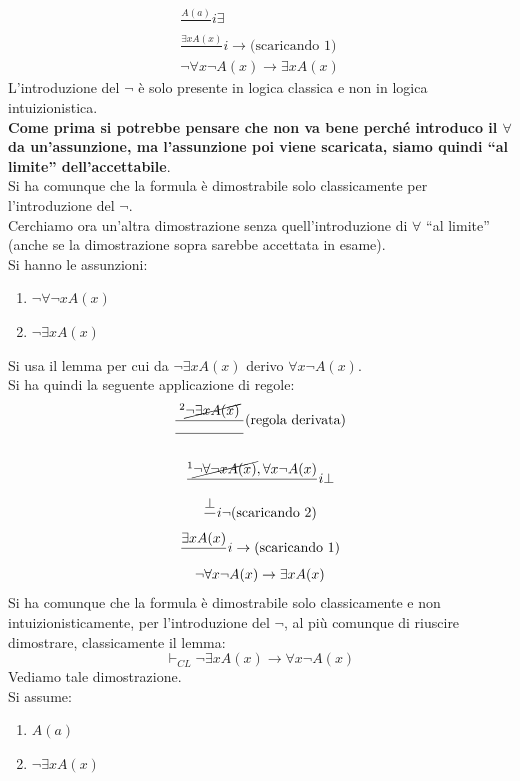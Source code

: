 \documentclass[a4paper,12pt, oneside]{book}
\begin{document}
\begin{esempio}
\begin{gather*}
    \frac{A(a)}{}i\exists\\
    \frac{\exists xA(x)}{}i\to\mbox{(scaricando 1)}\\
    \neg \forall x\neg A(x)\to\exists xA(x)
  \end{gather*}
  L'introduzione del $\neg$ è solo presente in logica classica e non in logica
  intuizionistica.\\
  \textbf{Come prima si potrebbe pensare che non va bene perché introduco il
    $\forall$ da un'assunzione, ma l'assunzione poi viene scaricata, siamo
    quindi ``al limite'' dell'accettabile}.\\ 
  Si ha comunque che la formula è dimostrabile solo classicamente per
  l'introduzione del $\neg$.\\
  Cerchiamo ora un'altra dimostrazione senza quell'introduzione di $\forall$
  ``al limite'' (anche se la dimostrazione sopra sarebbe accettata in esame).\\
  Si hanno le assunzioni:
  \begin{enumerate}
    \item $\neg \forall\neg x A(x)$
    \item $\neg \exists xA(x)$
  \end{enumerate}
  Si usa il lemma per cui da $\neg \exists xA(x)$ derivo $\forall x\neg A(x)$.\\
  Si ha quindi la seguente applicazione di regole:
  \begin{gather*}
    \frac{^2\cancel{\neg \exists xA(x)}}{\rule{49pt}{0.4pt}}\mbox{(regola
      derivata)}\\ 
    \\
    \frac{^1\cancel{\neg \forall\neg x A(x)}, \forall x\neg A(x)}{}i\bot\\
    \frac{\bot}{}i\neg\mbox{(scaricando 2)}\\
    \frac{\exists x A(x)}{}i\to\mbox{(scaricando 1)}\\
    \neg \forall x\neg A(x)\to\exists xA(x)
  \end{gather*}
  Si ha comunque che la formula è dimostrabile solo classicamente e non
  intuizionisticamente, per 
  l'introduzione del $\neg$, al più comunque di riuscire dimostrare,
  classicamente il lemma:
  \[\vdash_{CL}\neg\exists x A(x)\to \forall x \neg A(x)\]
  Vediamo tale dimostrazione.\\
  Si assume:
  \begin{enumerate}
    \item $A(a)$
    \item $\neg \exists x A(x)$

\end{enumerate}
\end{esempio}
\end{document}
